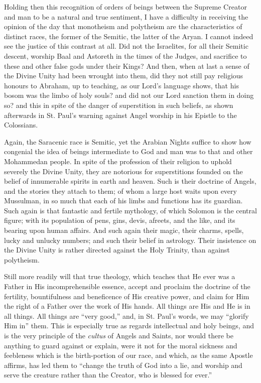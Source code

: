 Holding then this recognition of orders of beings between the
Supreme Creator and man to be a natural and true sentiment, I have a
difficulty in receiving the opinion of the day that monotheism and
polytheism are the characteristics of distinct races, the former of
the Semitic, the latter of the Aryan. I cannot indeed see the justice
of this contrast at all. Did not the Israelites, for all their Semitic
descent, worship Baal and Astoreth in the times of the Judges, and
sacrifice to these and other false gods under their Kings? And then,
when at last a sense of the Divine Unity had been wrought into them,
did they not still pay religious honours to Abraham, up to teaching,
as our Lord's language shows, that his bosom was the limbo of
holy souls? and did not our Lord sanction them in doing so? and this
in spite of the danger of superstition in such beliefs, as shown
afterwards in St. Paul's warning against Angel worship in his Epistle
to the Colossians.

Again, the Saracenic race is Semitic, yet the Arabian Nights
suffice to show how congenial the idea of beings intermediate to God
and man was to that and other Mohammedan people. In spite of the
profession of their religion to uphold severely the Divine Unity, they
are notorious for superstitions founded on the belief of innumerable
spirits in earth and heaven. Such is their doctrine of Angels, and the
stories they attach to them; of whom a large host waits upon every
Mussulman, in so much that each of his limbs and functions has its
guardian. Such again is that fantastic and fertile mythology, of which
Solomon is the central figure; with its population of pens, gins,
devis, afreets, and the like, and its bearing upon human affairs. And
such again their magic, their charms, spells, lucky and unlucky
numbers; and such their belief in astrology. Their insistence on the
Divine Unity is rather directed against the Holy Trinity, than against
polytheism.

Still more readily will that true theology, which teaches that He
ever was a Father in His incomprehensible essence, accept and
proclaim the doctrine of the fertility, bountifulness and beneficence
of His creative power, and claim for Him the right of a Father over
the work of His hands. All things are His and He is in all things. All
things are ``very good,'' and, in St. Paul's words, we may
``glorify Him in'' them. This is especially true as regards
intellectual and holy beings, and is the very principle of the \emph{cultus}
of Angels and Saints, nor would there be anything to guard against or
explain, were it not for the moral sickness and feebleness which is
the birth-portion of our race, and which, as the same Apostle affirms,
has led them to ``change the truth of God into a lie, and worship
and serve the creature rather than the Creator, who is blessed for
ever.''

